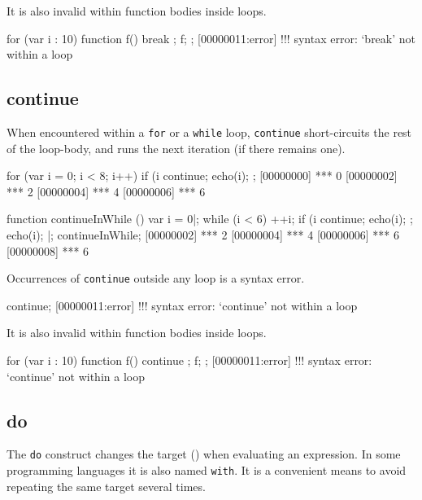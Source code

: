 It is also invalid within function bodies inside loops.

\begin{urbiscript}
for (var i : 10)
{
  function f() { break };
  f;
};
[00000011:error] !!! syntax error: `break' not within a loop
\end{urbiscript}


\subsection{continue}
\label{sec:lang:continue}

When encountered within a \lstinline|for| or a \lstinline|while| loop,
\lstinline|continue| short-circuits the rest of the loop-body, and
runs the next iteration (if there remains one).

\begin{urbiscript}
for (var i = 0; i < 8; i++)
{
  if (i %
    continue;
  echo(i);
};
[00000000] *** 0
[00000002] *** 2
[00000004] *** 4
[00000006] *** 6
\end{urbiscript}

\begin{urbiscript}
function continueInWhile ()
{
  var i = 0|;
  while (i < 6)
  {
    ++i;
    if (i %
      continue;
    echo(i);
  };
  echo(i);
}|;
continueInWhile;
[00000002] *** 2
[00000004] *** 4
[00000006] *** 6
[00000008] *** 6
\end{urbiscript}

Occurrences of \lstinline|continue| outside any loop is a syntax error.

\begin{urbiscript}
continue;
[00000011:error] !!! syntax error: `continue' not within a loop
\end{urbiscript}

It is also invalid within function bodies inside loops.

\begin{urbiscript}
for (var i : 10)
{
  function f() { continue };
  f;
};
[00000011:error] !!! syntax error: `continue' not within a loop
\end{urbiscript}

\subsection{do}
\label{sec:lang:do}

The \lstinline|do| construct changes the target (\this) when evaluating an
expression.  In some programming languages it is also named
\lstinline|with|.  It is a convenient means to avoid repeating the same
target several times.

